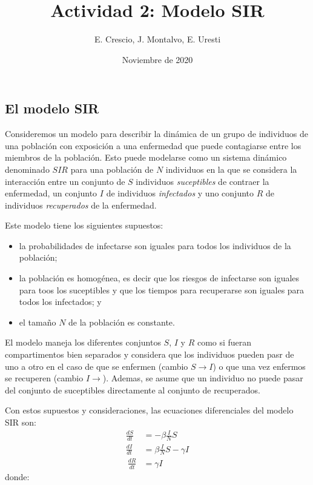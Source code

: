 \documentclass[
]{article}
\title{Actividad 2: Modelo SIR}
\author{E. Crescio, J. Montalvo, E. Uresti}
\date{Noviembre de 2020}
\begin{document}
\maketitle

\hypertarget{el-modelo-sir}{%
\subsection{El modelo SIR}\label{el-modelo-sir}}

Consideremos un modelo para describir la dinámica de un grupo de
individuos de una población con exposición a una enfermedad que puede
contagiarse entre los miembros de la población. Esto puede modelarse
como un sistema dinámico denominado \(SIR\) para una población de \(N\)
individuos en la que se considera la interacción entre un conjunto de
\(S\) individuos \emph{suceptibles} de contraer la enfermedad, un
conjunto \(I\) de individuos \emph{infectados} y uno conjunto \(R\) de
individuos \emph{recuperados} de la enfermedad.

Este modelo tiene los siguientes supuestos:

\begin{itemize}
\item
  la probabilidades de infectarse son iguales para todos los individuos
  de la población;
\item
  la población es homogénea, es decir que los riesgos de infectarse son
  iguales para toos los suceptibles y que los tiempos para recuperarse
  son iguales para todos los infectados; y
\item
  el tamaño \(N\) de la población es constante.
\end{itemize}

El modelo maneja los diferentes conjuntos \(S\), \(I\) y \(R\) como si
fueran compartimentos bien separados y considera que los individuos
pueden pasr de uno a otro en el caso de que se enfermen (cambio
\(S\rightarrow I\)) o que una vez enfermos se recuperen (cambio
\(I\rightarrow\)). Ademas, se asume que un individuo no puede pasar del
conjunto de suceptibles directamente al conjunto de recuperados.

Con estos supuestos y consideraciones, las ecuaciones diferenciales del
modelo SIR son: \[
\begin{aligned}
\frac{dS}{dt}&= -\beta \frac{I}{N} S\\
\frac{dI}{dt}&= \beta\frac{I}{N}S-\gamma I\\\
\frac{dR}{dt}&= \gamma I
\end{aligned}
\] donde:
\end{document}
